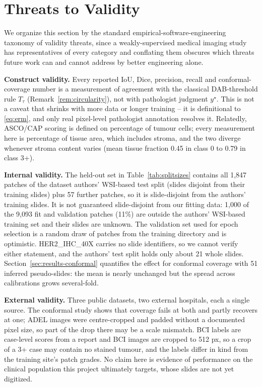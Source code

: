 \documentclass[conference]{IEEEtran}
\begin{document}
\section{Threats to Validity}
\label{sec:limitations}

We organize this section by the standard empirical-software-engineering
taxonomy of validity threats, since a weakly-supervised medical imaging
study has representatives of every category and conflating them obscures
which threats future work can and cannot address by better engineering
alone.

\textbf{Construct validity.} Every reported IoU, Dice, precision, recall
and conformal-coverage number is a measurement of agreement with the
classical DAB-threshold rule $T_\tau$ (Remark~\ref{rem:circularity}), not
with pathologist judgment $y^\star$. This is not a caveat that shrinks with
more data or longer training -- it is definitional to \eqref{eq:erm}, and
only real pixel-level pathologist annotation resolves it. Relatedly,
ASCO/CAP scoring \cite{wolff2018} is defined on percentage of tumour
cells; every measurement here is percentage of tissue area, which
includes stroma, and the two diverge whenever stroma content varies
(mean tissue fraction 0.45 in class 0 to 0.79 in class 3+).

\textbf{Internal validity.} The held-out set in Table~\ref{tab:splitsizes} contains all 1{,}847 patches of the dataset authors' WSI-based test split (slides disjoint from their training slides) plus 57 further patches, so it is slide-disjoint from the authors' training slides. It is not guaranteed slide-disjoint from our fitting data: 1{,}000 of the 9{,}093 fit and validation patches (11\%) are outside the authors' WSI-based training set and their slides are unknown. The validation set used for epoch selection is a random draw of patches from the training directory and is optimistic. HER2\_IHC\_40X carries no slide identifiers, so we cannot verify either statement, and the authors' test split holds only about 21 whole slides. Section~\ref{sec:results-conformal} quantifies the effect for conformal coverage with 51 inferred pseudo-slides: the mean is nearly unchanged but the spread across calibrations grows several-fold.

\textbf{External validity.} Three public datasets, two external hospitals, each a single source. The conformal
study shows that coverage fails at both and partly recovers at one; ADEL images were centre-cropped and padded without a documented pixel size, so part of the drop there may be a scale mismatch. BCI labels are case-level scores
from a report and BCI images are cropped to 512 px, so a crop of a 3+ case may
contain no stained tumour, and the labels differ in kind from the training
site's patch grades. No claim here is evidence of performance on the clinical
population this project ultimately targets, whose slides are not yet digitized.
\end{document}
